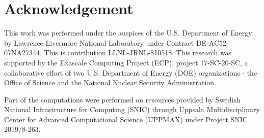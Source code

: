 \section*{Acknowledgement}

This work was performed under the auspices of the U.S. Department of Energy by Lawrence Livermore National Laboratory under Contract DE-AC52-07NA27344. This is contribution LLNL-JRNL-810518. This research was supported by the Exascale Computing Project (ECP), project 17-SC-20-SC, a collaborative effort of two U.S. Department of Energy (DOE) organizations - the Office of Science and the National Nuclear Security Administration.

Part of the computations were performed on resources provided by Swedish National Infrastructure for Computing (SNIC) through Uppsala Multidisciplinary Center for Advanced Computational Science (UPPMAX) under Project SNIC 2019/8-263.
